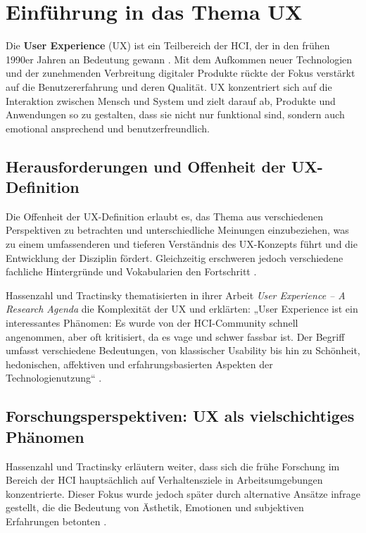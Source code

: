 \documentclass[12pt,oneside]{article}
\begin{document}
 




\section{Einführung in das Thema UX}

Die \textbf{User Experience} (UX) ist ein Teilbereich der HCI, der in den frühen 1990er Jahren an Bedeutung gewann \cite{glanznig}. Mit dem Aufkommen neuer Technologien und der zunehmenden Verbreitung digitaler Produkte rückte der Fokus verstärkt auf die Benutzererfahrung und deren Qualität. UX konzentriert sich auf die Interaktion zwischen Mensch und System und zielt darauf ab, Produkte und Anwendungen so zu gestalten, dass sie nicht nur funktional sind, sondern auch emotional ansprechend und benutzerfreundlich.

\subsection{Herausforderungen und Offenheit der UX-Definition}

Die Offenheit der UX-Definition erlaubt es, das Thema aus verschiedenen Perspektiven zu betrachten und unterschiedliche Meinungen einzubeziehen, was zu einem umfassenderen und tieferen Verständnis des UX-Konzepts führt und die Entwicklung der Disziplin fördert. Gleichzeitig erschweren jedoch verschiedene fachliche Hintergründe und Vokabularien den Fortschritt \cite{glanznig}.

Hassenzahl und Tractinsky thematisierten in ihrer Arbeit \textit{User Experience – A Research Agenda} die Komplexität der UX und erklärten: „User Experience ist ein interessantes Phänomen: Es wurde von der HCI-Community schnell angenommen, aber oft kritisiert, da es vage und schwer fassbar ist. Der Begriff umfasst verschiedene Bedeutungen, von klassischer Usability bis hin zu Schönheit, hedonischen, affektiven und erfahrungsbasierten Aspekten der Technologienutzung“ \cite{research}.

\subsection{Forschungsperspektiven: UX als vielschichtiges Phänomen}

Hassenzahl und Tractinsky erläutern weiter, dass sich die frühe Forschung im Bereich der HCI hauptsächlich auf Verhaltensziele in Arbeitsumgebungen konzentrierte. Dieser Fokus wurde jedoch später durch alternative Ansätze infrage gestellt, die die Bedeutung von Ästhetik, Emotionen und subjektiven Erfahrungen betonten \cite{research}.
\end{document}
